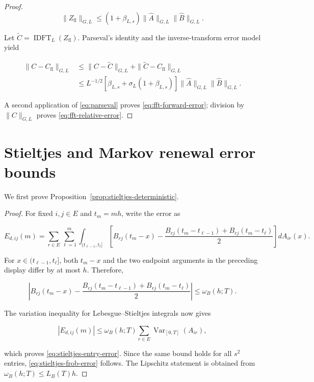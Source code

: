 \documentclass[3p,12pt,authoryear]{elsarticle}
\theoremstyle{definition}
\theoremstyle{remark}
\newcommand{\fl}{\mathrm{fl}}
\begin{document}
\begin{proof}
\begin{equation*}
\|Z_{\fl}\|_{G,L}
\leq
(1+\beta_{L,s})\|\widehat A\|_{G,L}\|\widehat B\|_{G,L}.
\end{equation*}

Let $\widetilde C=\operatorname{IDFT}_L(Z_{\fl})$. Parseval's identity and the inverse-transform error model yield

\begin{equation*}
\begin{aligned}
\|C-C_{\fl}\|_{G,L}
&\leq
\|C-\widetilde C\|_{G,L}
+
\|\widetilde C-C_{\fl}\|_{G,L}\\
&\leq
L^{-1/2}
\left[\beta_{L,s}+\sigma_L(1+\beta_{L,s})\right]
\|\widehat A\|_{G,L}\|\widehat B\|_{G,L}.
\end{aligned}
\end{equation*}

A second application of \eqref{eq:parseval} proves \eqref{eq:fft-forward-error}; division by $\|C\|_{G,L}$ proves \eqref{eq:fft-relative-error}.
\end{proof}

\section{Stieltjes and Markov renewal error bounds}\label{app:mre-proof}

We first prove Proposition~\ref{prop:stieltjes-deterministic}.

\begin{proof}
For fixed $i,j\in E$ and $t_m=mh$, write the error as

\begin{equation*}
E_{d,ij}(m)
=
\sum_{r\in E}\sum_{\ell=1}^{m}
\int_{(t_{\ell-1},t_\ell]}
\left[
B_{rj}(t_m-x)
-
\frac{B_{rj}(t_m-t_{\ell-1})+B_{rj}(t_m-t_\ell)}{2}
\right]dA_{ir}(x).
\end{equation*}

For $x\in(t_{\ell-1},t_\ell]$, both $t_m-x$ and the two endpoint arguments in the preceding display differ by at most $h$. Therefore,

\begin{equation*}
\left|
B_{rj}(t_m-x)
-
\frac{B_{rj}(t_m-t_{\ell-1})+B_{rj}(t_m-t_\ell)}{2}
\right|
\leq
\omega_B(h;T).
\end{equation*}

The variation inequality for Lebesgue--Stieltjes integrals now gives

\begin{equation*}
|E_{d,ij}(m)|
\leq
\omega_B(h;T)
\sum_{r\in E}\operatorname{Var}_{[0,T]}(A_{ir}),
\end{equation*}

which proves \eqref{eq:stieltjes-entry-error}. Since the same bound holds for all $s^2$ entries, \eqref{eq:stieltjes-frob-error} follows. The Lipschitz statement is obtained from $\omega_B(h;T)\leq L_B(T)h$.
\end{proof}
\end{document}
